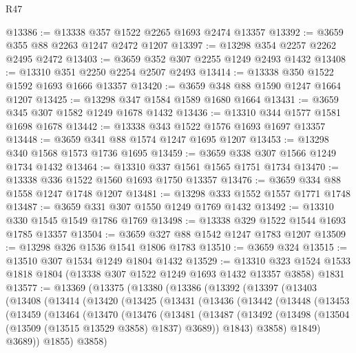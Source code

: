 \begin{lexlean}{R47}
\begin{coremodule}
@13386 := @13338 @357 @1522 @2265 @1693 @2474 @13357
@13392 := @3659 @355 @88 @2263 @1247 @2472 @1207
@13397 := @13298 @354 @2257 @2262 @2495 @2472
@13403 := @3659 @352 @307 @2255 @1249 @2493 @1432
@13408 := @13310 @351 @2250 @2254 @2507 @2493
@13414 := @13338 @350 @1522 @1592 @1693 @1666 @13357
@13420 := @3659 @348 @88 @1590 @1247 @1664 @1207
@13425 := @13298 @347 @1584 @1589 @1680 @1664
@13431 := @3659 @345 @307 @1582 @1249 @1678 @1432
@13436 := @13310 @344 @1577 @1581 @1698 @1678
@13442 := @13338 @343 @1522 @1576 @1693 @1697 @13357
@13448 := @3659 @341 @88 @1574 @1247 @1695 @1207
@13453 := @13298 @340 @1568 @1573 @1736 @1695
@13459 := @3659 @338 @307 @1566 @1249 @1734 @1432
@13464 := @13310 @337 @1561 @1565 @1751 @1734
@13470 := @13338 @336 @1522 @1560 @1693 @1750 @13357
@13476 := @3659 @334 @88 @1558 @1247 @1748 @1207
@13481 := @13298 @333 @1552 @1557 @1771 @1748
@13487 := @3659 @331 @307 @1550 @1249 @1769 @1432
@13492 := @13310 @330 @1545 @1549 @1786 @1769
@13498 := @13338 @329 @1522 @1544 @1693 @1785 @13357
@13504 := @3659 @327 @88 @1542 @1247 @1783 @1207
@13509 := @13298 @326 @1536 @1541 @1806 @1783
@13510 := @3659 @324
@13515 := @13510 @307 @1534 @1249 @1804 @1432
@13529 := @13310
    @323
    @1524
    @1533
    @1818
    @1804
    (@13338 @307 @1522 @1249 @1693 @1432 @13357 @3858)
    @1831
@13577 := @13369
    (@13375
      (@13380
        (@13386
          (@13392
            (@13397
              (@13403
                (@13408
                  (@13414
                    (@13420
                      (@13425
                        (@13431
                          (@13436
                            (@13442
                              (@13448
                                (@13453
                                  (@13459
                                    (@13464
                                      (@13470
                                        (@13476
                                          (@13481
                                            (@13487
                                              (@13492
                                                (@13498
                                                  (@13504
                                                    (@13509 (@13515 @13529 @3858) @1837)
                                                    @3689))
                                                @1843)
                                              @3858)
                                            @1849)
                                          @3689))
                                      @1855)
                                    @3858)

\end{coremodule}
\end{lexlean}
